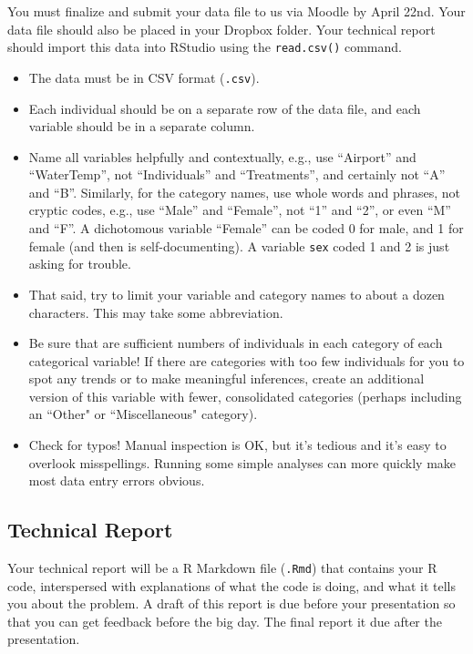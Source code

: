 \documentclass[10pt]{article}
\begin{document}
You must finalize and submit your data file to us via Moodle by April 22nd. Your data file should also be placed in your Dropbox folder. Your technical report should import this data into RStudio using the \texttt{read.csv()} command. 

\begin{itemize}
	\item The data must be in CSV format (\texttt{.csv}).
	\item Each individual should be on a separate row of the data file, and each variable should be in a separate column.
	\item Name all variables helpfully and contextually, e.g., use “Airport” and “WaterTemp”, not “Individuals” and “Treatments”, and certainly not “A” and “B”.
Similarly, for the category names, use whole words and phrases, not cryptic codes, e.g., use “Male” and “Female”, not “1” and “2”, or even “M” and “F”.  A dichotomous variable “Female” can be coded 0 for male, and 1 for female (and then is self-documenting). A variable {\tt sex} coded 1 and 2 is just asking for trouble.
	\item That said, try to limit your variable and category names to about a dozen characters.  This may take some abbreviation.
	\item Be sure that are sufficient numbers of individuals in each category of each categorical variable!  If there are categories with too few individuals for you to spot any trends or to make meaningful inferences, create an additional version of this variable with fewer, consolidated categories (perhaps including an ``Other" or ``Miscellaneous" category).
	\item Check for typos!  Manual inspection is OK, but it’s tedious and it’s easy to overlook misspellings.  Running some simple analyses can more quickly make most data entry errors obvious.
\end{itemize}

\subsection{Technical Report}

Your technical report will be a R Markdown file (\texttt{.Rmd}) that contains your R code, interspersed with explanations of what the code is doing, and what it tells you about the problem. A draft of this report is due before your presentation so that you can get feedback before the big day. The final report it due after the presentation.
	
\end{document}
